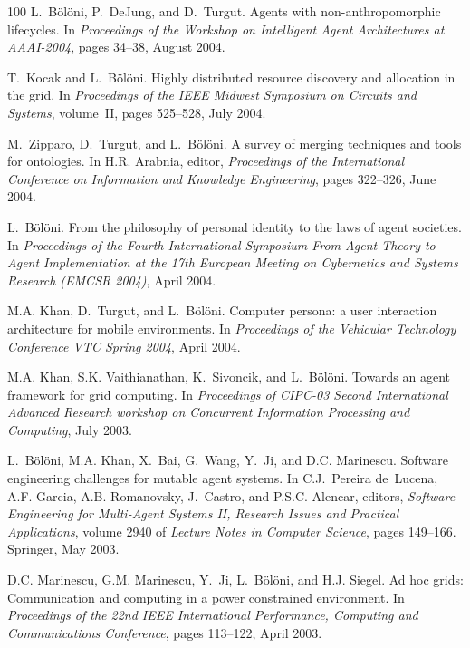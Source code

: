 \begin{thebibliography}{100}
L.~Bölöni, P.~DeJung, and D.~Turgut.
\newblock Agents with non-anthropomorphic lifecycles.
\newblock In {\em Proceedings of the Workshop on Intelligent Agent
  Architectures at AAAI-2004}, pages 34--38, August 2004.

T.~Kocak and L.~Bölöni.
\newblock Highly distributed resource discovery and allocation in the grid.
\newblock In {\em Proceedings of the IEEE Midwest Symposium on Circuits and
  Systems}, volume~II, pages 525--528, July 2004.

M.~Zipparo, D.~Turgut, and L.~Bölöni.
\newblock A survey of merging techniques and tools for ontologies.
\newblock In H.R. Arabnia, editor, {\em Proceedings of the International
  Conference on Information and Knowledge Engineering}, pages 322--326, June
  2004.

L.~Bölöni.
\newblock From the philosophy of personal identity to the laws of agent
  societies.
\newblock In {\em Proceedings of the Fourth International Symposium From Agent
  Theory to Agent Implementation at the 17th European Meeting on Cybernetics
  and Systems Research (EMCSR 2004)}, April 2004.

M.A. Khan, D.~Turgut, and L.~Bölöni.
\newblock Computer persona: a user interaction architecture for mobile
  environments.
\newblock In {\em Proceedings of the Vehicular Technology Conference VTC Spring
  2004}, April 2004.

M.A. Khan, S.K. Vaithianathan, K.~Sivoncik, and L.~Bölöni.
\newblock Towards an agent framework for grid computing.
\newblock In {\em Proceedings of CIPC-03 Second International Advanced Research
  workshop on Concurrent Information Processing and Computing}, July 2003.

L.~Bölöni, M.A. Khan, X.~Bai, G.~Wang, Y.~Ji, and D.C. Marinescu.
\newblock Software engineering challenges for mutable agent systems.
\newblock In C.J.~Pereira de~Lucena, A.F. Garcia, A.B. Romanovsky, J.~Castro,
  and P.S.C. Alencar, editors, {\em Software Engineering for Multi-Agent
  Systems II, Research Issues and Practical Applications}, volume 2940 of {\em
  Lecture Notes in Computer Science}, pages 149--166. Springer, May 2003.

D.C. Marinescu, G.M. Marinescu, Y.~Ji, L.~Bölöni, and H.J. Siegel.
\newblock Ad hoc grids: Communication and computing in a power constrained
  environment.
\newblock In {\em Proceedings of the 22nd IEEE International Performance,
  Computing and Communications Conference}, pages 113--122, April 2003.


\end{thebibliography}
